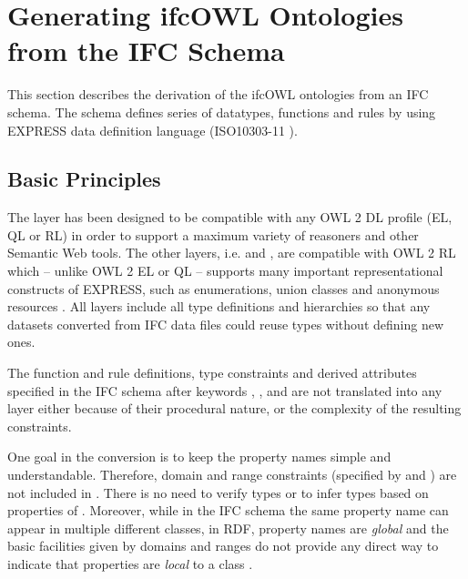 
\section{Generating ifcOWL Ontologies from the IFC Schema}
\label{sec:ifcOWL}
This section describes the derivation of the ifcOWL ontologies from an IFC schema. The schema defines series of datatypes, functions and rules by using EXPRESS data definition language (ISO10303-11 \cite{schenck1994information}).

\subsection{Basic Principles}

The \ifcsimple{} layer has been designed to be compatible with any OWL 2 DL profile (EL, QL or RL) in order to support a maximum variety of reasoners and other Semantic Web tools. The other layers, i.e. \standard{} and \extended{}, are compatible with OWL 2 RL which -- unlike OWL 2 EL or QL -- supports many important representational constructs of EXPRESS, such as enumerations, union classes and anonymous resources \cite{motik2012owl}. All \ifcowl{} layers include all type definitions and hierarchies so that any \ifcrdf{} datasets converted from IFC data files could reuse types without defining new ones.

The function and rule definitions, type constraints and derived attributes specified in the IFC schema after keywords , , and  are not translated into any \ifcowl{} layer either because of their procedural nature, or the complexity of the resulting constraints.

One goal in the conversion is to keep the property names simple and understandable. Therefore, domain and range constraints (specified by  and ) are not included in \ifcowl{}. There is no need to verify types or to infer types based on properties of \ifcowl{}. Moreover, while in the IFC schema the same property name can appear in multiple different classes, in RDF, property names are \emph{global} and the basic facilities given by domains and ranges do not provide any direct way to indicate that properties are \emph{local} to a class \cite{world2014rdf}. 

